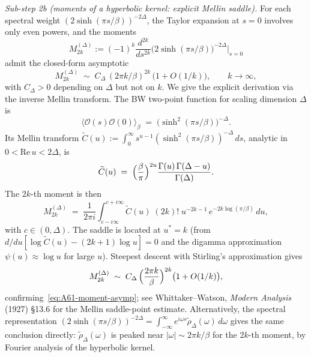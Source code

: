 \documentclass[12pt,a4paper]{article}
\begin{document}
\emph{Sub-step 2b (moments of a hyperbolic kernel: explicit Mellin saddle).}
For each spectral weight $(2\sinh(\pi s/\beta))^{-2\Delta}$, the
Taylor expansion at $s=0$ involves only even powers, and the moments
\[
  M_{2k}^{(\Delta)} := (-1)^k \frac{d^{2k}}{ds^{2k}}
  \bigl(2\sinh(\pi s/\beta)\bigr)^{-2\Delta}\Big|_{s=0}
\]
admit the closed-form asymptotic
\begin{equation}
  M_{2k}^{(\Delta)}
  \;\sim\;
  C_\Delta \,(2\pi k/\beta)^{2k}
  \,\bigl(1 + O(1/k)\bigr),
  \qquad k\to\infty,
  \label{eq:A61-moment-asymp}
\end{equation}
with $C_\Delta > 0$ depending on $\Delta$ but not on $k$.
We give the explicit derivation via the inverse Mellin transform.
The BW two-point function for scaling dimension $\Delta$ is
\begin{equation}
  \langle\mathcal{O}(s)\mathcal{O}(0)\rangle_\beta
  \;=\;
  \bigl(\sinh^2(\pi s/\beta)\bigr)^{-\Delta}.
  \label{eq:A61-bw-twopt-expl}
\end{equation}
Its Mellin transform $\widetilde{C}(u) := \int_0^\infty s^{u-1}
(\sinh^2(\pi s/\beta))^{-\Delta}\,ds$, analytic in $0 < \mathrm{Re}\,u < 2\Delta$, is
\begin{equation}
  \widetilde{C}(u)
  \;=\;
  \Bigl(\frac{\beta}{\pi}\Bigr)^{2u}
  \frac{\Gamma(u)\,\Gamma(\Delta - u)}{\Gamma(\Delta)}.
  \label{eq:A61-mellin-transform}
\end{equation}
The $2k$-th moment is then
\begin{equation}
  M_{2k}^{(\Delta)}
  \;=\;
  \frac{1}{2\pi i}
  \int_{c-i\infty}^{c+i\infty}
  \widetilde{C}(u)\;(2k)!\;u^{-2k-1}\,
  e^{-2k\log(\pi/\beta)}\,du,
  \label{eq:A61-inverse-mellin}
\end{equation}
with $c \in (0,\Delta)$.
The saddle is located at $u^* = k$ (from $d/du[\log\widetilde{C}(u) - (2k+1)\log u]
= 0$ and the digamma approximation $\psi(u) \approx \log u$ for large $u$).
Steepest descent with Stirling's approximation gives
\begin{equation}
  M_{2k}^{(\Delta)}
  \;\sim\;
  C_\Delta\,\Bigl(\frac{2\pi k}{\beta}\Bigr)^{2k}\bigl(1+O(1/k)\bigr),
  \label{eq:A61-saddle-result}
\end{equation}
confirming~\eqref{eq:A61-moment-asymp}; see Whittaker--Watson, \emph{Modern
Analysis} (1927) \S 13.6 for the Mellin saddle-point estimate.
Alternatively, the spectral representation
$(2\sinh(\pi s/\beta))^{-2\Delta} = \int_{-\infty}^\infty e^{i\omega s}
\tilde\rho_\Delta(\omega)\,d\omega$ gives the same conclusion directly:
$\tilde\rho_\Delta(\omega)$ is peaked near $|\omega| \sim 2\pi k/\beta$
for the $2k$-th moment, by Fourier analysis of the hyperbolic kernel.
\end{document}
